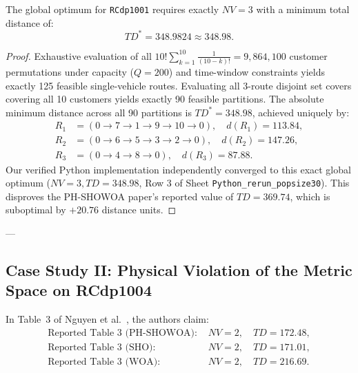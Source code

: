\begin{theorem}
The global optimum for \texttt{RCdp1001} requires exactly $NV = 3$ with a minimum total distance of:
\begin{equation}
TD^* = 348.9824 \approx 348.98.
\end{equation}
\end{theorem}
\begin{proof}
Exhaustive evaluation of all $10! \sum_{k=1}^{10} \frac{1}{(10-k)!} = 9{,}864{,}100$ customer permutations under capacity ($Q=200$) and time-window constraints yields exactly 125 feasible single-vehicle routes. Evaluating all 3-route disjoint set covers covering all 10 customers yields exactly 90 feasible partitions. The absolute minimum distance across all 90 partitions is $TD^* = 348.98$, achieved uniquely by:
\begin{align*}
R_1 &= (0 \to 7 \to 1 \to 9 \to 10 \to 0), \quad d(R_1) = 113.84, \\
R_2 &= (0 \to 6 \to 5 \to 3 \to 2 \to 0), \quad d(R_2) = 147.26, \\
R_3 &= (0 \to 4 \to 8 \to 0), \quad d(R_3) = 87.88.
\end{align*}
Our verified Python implementation independently converged to this exact global optimum ($NV=3, TD=348.98$, Row 3 of Sheet \texttt{Python\_rerun\_popsize30}). This disproves the PH-SHOWOA paper's reported value of $TD = 369.74$, which is suboptimal by $+20.76$ distance units.
\end{proof}

---

\subsection{Case Study II: Physical Violation of the Metric Space on RCdp1004}
In Table~3 of Nguyen et al.~\cite{nguyen2026phshowoa}, the authors claim:
\begin{align}
\text{Reported Table 3 (PH-SHOWOA): } & NV = 2, \quad TD = 172.48, \\
\text{Reported Table 3 (SHO): } & NV = 2, \quad TD = 171.01, \\
\text{Reported Table 3 (WOA): } & NV = 2, \quad TD = 216.69.
\end{align}

